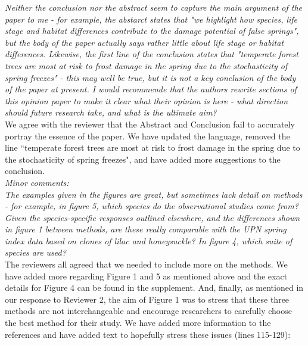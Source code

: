 \documentclass[11pt,a4paper]{article}
\begin{document}
\textit{Neither the conclusion nor the abstract seem to capture the main argument of the paper to me - for example, the abstarct states that "we highlight how species, life stage and habitat differences contribute to the damage potential of false springs", but the body of the paper actually says rather little about life stage or habitat differences.  Likewise, the first line of the conclusion states that "temperate forest trees are most at risk to frost damage in the spring due to the stochasticity of spring freezes" - this may well be true, but it is not a key conclusion of the body of the paper at present. I would recommende that the authors rewrite sections of this opinion paper to make it clear what their opinion is here - what direction should future research take, and what is the ultimate aim?} \\

We agree with the reviewer that the Abstract and Conclusion fail to accurately portray the essence of the paper. We have updated the language, removed the line ``temperate forest trees are most at risk to frost damage in the spring due to the stochasticity of spring freezes", and have added more suggestions to the conclusion. \\


\textit{Minor comments: \\
The examples given in the figures are great, but sometimes lack detail on methods - for example, in figure 5, which species do the observational studies come from?  Given the species-specific responses outlined elsewhere, and the differences shown in figure 1 between methods, are these really comparable with the UPN spring index data based on clones of lilac and honeysuckle?
In figure 4, which suite of species are used?} \\

The reviewers all agreed that we needed to include more on the methods. We have added more regarding Figure 1 and 5 as mentioned above and the exact details for Figure 4 can be found in the supplement. And, finally, as mentioned in our response to Reviewer 2, the aim of Figure 1 was to stress that these three methods are not interchangeable and encourage researchers to carefully choose the best method for their study. We have added more information to the references and have added text to hopefully stress these issues (lines 115-129):
\end{document}
